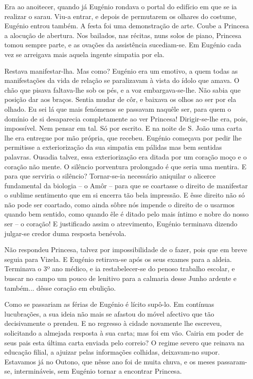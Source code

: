 \documentclass[9pt]{article}
\begin{document}
Era ao anoitecer, quan\-do já Eugé\-nio rondava o portal do edifício
em que se ia realizar o sarau. Viu-a entrar, e depois de permutarem os
o\-lhares do costume, Eugé\-nio entrou também. A festa foi uma demonstra\-ção
de arte. Coube a Princesa a alocu\-ção de abertura. Nos bailados, nas
récitas, nuns solos de piano, Princesa tomou sempre parte, e as ova\-ções
da assistência sucediam-se. Em Eugé\-nio cada vez se arreigava mais aquela ingente simpatia por ela.

Restava manifestar-\-lha. Mas como? Eugé\-nio era um emotivo, a quem
todas as manifesta\-ções da vida de rela\-ção se paralizavam à vista do
ídolo que amava. O chão que pisava faltava-\-lhe sob os pés, e a voz embargava-se-\-lhe. Não sabia que posi\-ção dar aos braços. Sentia mudar de
côr, e baixava os o\-lhos ao ser por ela o\-lhado. Eu sei lá que mais fenómenos se passavam na\-quê\-le ser, para quem o domínio de si desaparecia
completamente ao ver Princesa! Dirigir-se-\-lhe era, pois, impossível.
Nem pensar em tal. Só por escrito. E na noite de S. João uma carta lhe
era entregue por mão própria, que recebeu. Eugé\-nio começava por pedir
\-lhe permitisse a exterioriza\-ção da sua simpatia em pálidas mas bem
sentidas palavras. Ousadia talvez, essa exterioriza\-ção era ditada por
um cora\-ção moço e o cora\-ção não mente. O silêncio porventura prolongado é que seria uma mentira. E para que serviria o silêncio? Tornar-se-ia necessário aniquilar o alicerce fundamental da biologia -- o Amôr -- para que se coartasse o direito de manifestar o sublime sentimento que em si encerra tão bela impressão. E êsse direito não só não
pode ser coartado, como ainda sôbre nós impende o direito de o usarmos
quan\-do bem sentido, como quan\-do êle é ditado pelo mais íntimo e nobre
do nosso ser -- o cora\-ção! E justifi\-cado assim o atrevimento, Eugé\-nio
terminava dizendo julgar-se credor duma resposta benévola.

Não respondeu Princesa, talvez por impossibilidade de o fazer, pois
que em breve seguia para Vizela. E Eugé\-nio retirava-se após os seus
exames para a aldeia. Terminava o 3º ano médico, e ia restabelecer-se
do penoso traba\-lho escolar, e buscar no campo um pouco de lenitivo para a calmaria desse Junho ardente e também... dêsse cora\-ção em ebuli\-ção.

Como se passariam as férias de Eugé\-nio é lícito supô-lo. Em con\-tí\-nuas lucubra\-ções, a sua ideia não mais se afastou do móvel afectivo
que tão decisivamente o prendeu. E no regresso à cidade novamente lhe
escreveu, solicitando a almejada resposta à sua carta; mas foi em
vão. Cairia em poder de seus pais esta última carta enviada pelo correio? O regime severo que reinava na educa\-ção filial, a ajuizar pelas
informa\-ções co\-lhidas, deixavam-no supor. Estavamos já no Outono, que
nêsse ano foi de muita chuva, e os meses passaram-se, intermináveis,
sem Eugé\-nio tornar a encontrar Princesa.
\end{document}
